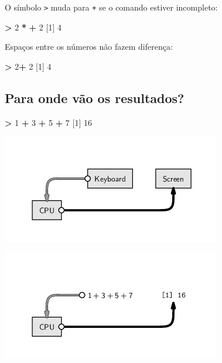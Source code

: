 \documentclass[10pt,a4paper]{book}
\newenvironment{Shaded}{\begin{snugshade}}{\end{snugshade}}
\newcommand{\DecValTok}[1]{\textcolor[rgb]{0.00,0.00,0.81}{#1}}
\newcommand{\StringTok}[1]{\textcolor[rgb]{0.31,0.60,0.02}{#1}}
\newcommand{\OperatorTok}[1]{\textcolor[rgb]{0.81,0.36,0.00}{\textbf{#1}}}
\newcommand{\NormalTok}[1]{#1}
\begin{document}
O símbolo \texttt{\textgreater{}} muda para \texttt{+} se o comando
estiver incompleto:

\begin{Shaded}
\begin{Highlighting}[]
\OperatorTok{>}\StringTok{ }\DecValTok{2} \OperatorTok{*}
\OperatorTok{+}\StringTok{ }\DecValTok{2}
\NormalTok{[}\DecValTok{1}\NormalTok{] }\DecValTok{4}
\end{Highlighting}
\end{Shaded}

Espaços entre os números não fazem diferença:

\begin{Shaded}
\begin{Highlighting}[]
\OperatorTok{>}\StringTok{ }\DecValTok{2}\OperatorTok{+}\StringTok{         }\DecValTok{2}
\NormalTok{[}\DecValTok{1}\NormalTok{] }\DecValTok{4}
\end{Highlighting}
\end{Shaded}

\subsection{Para onde vão os
resultados?}\label{para-onde-vao-os-resultados}

\begin{Shaded}
\begin{Highlighting}[]
\OperatorTok{>}\StringTok{ }\DecValTok{1} \OperatorTok{+}\StringTok{ }\DecValTok{3} \OperatorTok{+}\StringTok{ }\DecValTok{5} \OperatorTok{+}\StringTok{ }\DecValTok{7}
\NormalTok{[}\DecValTok{1}\NormalTok{] }\DecValTok{16}
\end{Highlighting}
\end{Shaded}

\begin{center}\includegraphics[width=0.5\linewidth]{img/script-commandline} \end{center}

\begin{center}\includegraphics[width=0.5\linewidth]{img/script-commandlinedata} \end{center}
\end{document}
